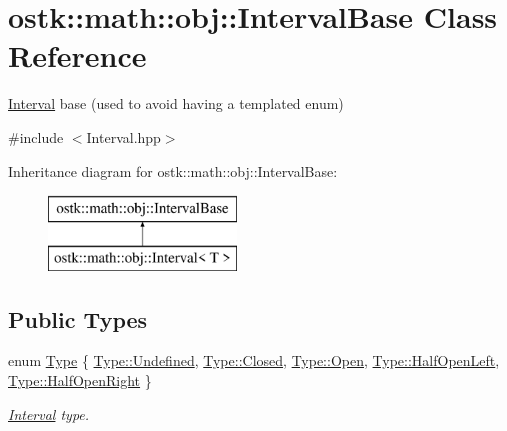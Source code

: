 \hypertarget{classostk_1_1math_1_1obj_1_1_interval_base}{}\section{ostk\+:\+:math\+:\+:obj\+:\+:Interval\+Base Class Reference}
\label{classostk_1_1math_1_1obj_1_1_interval_base}


\hyperlink{classostk_1_1math_1_1obj_1_1_interval}{Interval} base (used to avoid having a templated enum)  




{\ttfamily \#include $<$Interval.\+hpp$>$}

Inheritance diagram for ostk\+:\+:math\+:\+:obj\+:\+:Interval\+Base\+:\begin{figure}[H]
\begin{center}
\leavevmode
\includegraphics[height=2.000000cm]{classostk_1_1math_1_1obj_1_1_interval_base}
\end{center}
\end{figure}
\subsection*{Public Types}
\begin{DoxyCompactItemize}
\item 
enum \hyperlink{classostk_1_1math_1_1obj_1_1_interval_base_a0dd9bd29a9bfefa26de9b88ac81de92a}{Type} \{ \newline
\hyperlink{classostk_1_1math_1_1obj_1_1_interval_base_a0dd9bd29a9bfefa26de9b88ac81de92aaec0fc0100c4fc1ce4eea230c3dc10360}{Type\+::\+Undefined}, 
\hyperlink{classostk_1_1math_1_1obj_1_1_interval_base_a0dd9bd29a9bfefa26de9b88ac81de92aa03f4a47830f97377a35321051685071e}{Type\+::\+Closed}, 
\hyperlink{classostk_1_1math_1_1obj_1_1_interval_base_a0dd9bd29a9bfefa26de9b88ac81de92aac3bf447eabe632720a3aa1a7ce401274}{Type\+::\+Open}, 
\hyperlink{classostk_1_1math_1_1obj_1_1_interval_base_a0dd9bd29a9bfefa26de9b88ac81de92aab5e08f9173f660e791d3ba99ff8281d7}{Type\+::\+Half\+Open\+Left}, 
\newline
\hyperlink{classostk_1_1math_1_1obj_1_1_interval_base_a0dd9bd29a9bfefa26de9b88ac81de92aa484f1b37e0208f622a1e6f7a3ff8c2c3}{Type\+::\+Half\+Open\+Right}
 \}\begin{DoxyCompactList}\small\item\em \hyperlink{classostk_1_1math_1_1obj_1_1_interval}{Interval} type. \end{DoxyCompactList}
\end{DoxyCompactItemize}


